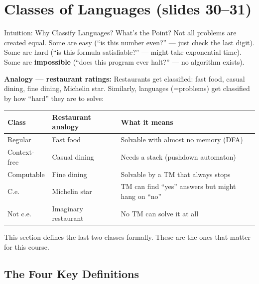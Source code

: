 \documentclass[11pt,a4paper]{article}
\begin{document}
\section{Classes of Languages (slides 30--31)}

\begin{conceptbox}{Intuition: Why Classify Languages? What's the Point?}
Not all problems are created equal. Some are easy (``is this number even?'' --- just check the last digit). Some are hard (``is this formula satisfiable?'' --- might take exponential time). Some are \textbf{impossible} (``does this program ever halt?'' --- no algorithm exists).

\textbf{Analogy --- restaurant ratings:} Restaurants get classified: fast food, casual dining, fine dining, Michelin star. Similarly, languages (=problems) get classified by how ``hard'' they are to solve:

\begin{center}
\begin{tabular}{lll}
\toprule
\textbf{Class} & \textbf{Restaurant analogy} & \textbf{What it means} \\
\midrule
Regular & Fast food & Solvable with almost no memory (DFA) \\
Context-free & Casual dining & Needs a stack (pushdown automaton) \\
Computable & Fine dining & Solvable by a TM that always stops \\
C.e. & Michelin star & TM can find ``yes'' answers but might hang on ``no'' \\
Not c.e. & Imaginary restaurant & No TM can solve it at all \\
\bottomrule
\end{tabular}
\end{center}

This section defines the last two classes formally. These are the ones that matter for this course.
\end{conceptbox}

\subsection{The Four Key Definitions}
\end{document}
